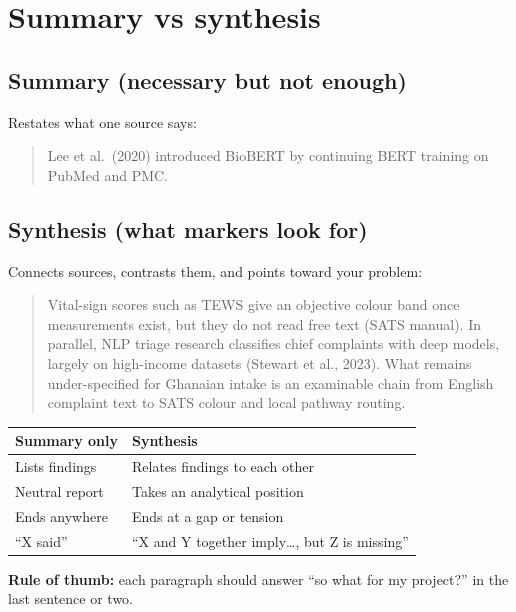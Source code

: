 \documentclass[11pt,a4paper]{article}
\begin{document}
\section{Summary vs synthesis}

\subsection{Summary (necessary but not enough)}
Restates what one source says:
\begin{quote}
Lee et al.\ (2020) introduced BioBERT by continuing BERT training on PubMed and PMC.
\end{quote}

\subsection{Synthesis (what markers look for)}
Connects sources, contrasts them, and points toward your problem:
\begin{quote}
Vital-sign scores such as TEWS give an objective colour band once measurements exist, but they do not read free text (SATS manual).
In parallel, NLP triage research classifies chief complaints with deep models, largely on high-income datasets (Stewart et al., 2023).
What remains under-specified for Ghanaian intake is an examinable chain from English complaint text to SATS colour and local pathway routing.
\end{quote}

\begin{center}
\begin{tabular}{@{}p{}p{}@{}}
\toprule
\textbf{Summary only} & \textbf{Synthesis} \\
\midrule
Lists findings & Relates findings to each other \\
Neutral report & Takes an analytical position \\
Ends anywhere & Ends at a gap or tension \\
``X said'' & ``X and Y together imply\ldots, but Z is missing'' \\
\bottomrule
\end{tabular}
\end{center}

\begin{tipbox}
\textbf{Rule of thumb:} each paragraph should answer ``so what for my project?'' in the last sentence or two.
\end{tipbox}
\end{document}

